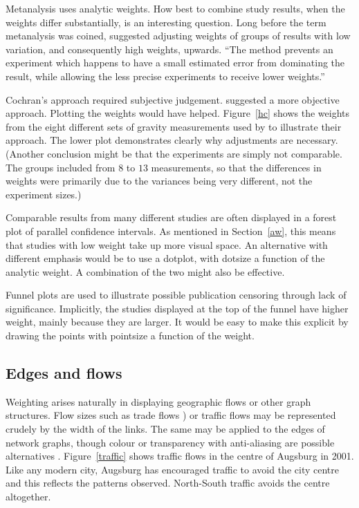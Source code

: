 \documentclass{svmult}
\begin{document}
Metanalysis uses analytic weights.  How best to combine study results, when the weights differ substantially, is an interesting question.  Long before the term metanalysis was coined, \cite{cochran:1954b} suggested adjusting weights of groups of results with low variation, and consequently high weights, upwards.  ``The method prevents an experiment which happens to have a small estimated error from dominating the result, while allowing the less precise experiments to receive lower weights.''

Cochran's approach required subjective judgement.  \cite{mosteller:1982} suggested a more objective approach.  Plotting the weights would have helped.  Figure~\ref{hc} shows the weights from the eight different sets of gravity measurements used by \cite{mosteller:1982} to illustrate their approach.  The lower plot demonstrates clearly why adjustments are necessary.  (Another conclusion might be that the experiments are simply not comparable.  The groups included from $8$ to $13$ measurements, so that the differences in weights were primarily due to the variances being very different, not the experiment sizes.)

Comparable results from many different studies are often displayed in a forest plot of parallel confidence intervals.  As mentioned in Section~\ref{aw}, this means that studies with low weight take up more visual space.  An alternative with different emphasis would be to use a dotplot, with dotsize a function of the analytic weight.  A combination of the two might also be effective.

Funnel plots are used to illustrate possible publication censoring through lack of significance.  Implicitly, the studies displayed at the top of the funnel have higher weight, mainly because they are larger.  It would be easy to make this explicit by drawing the points with pointsize a function of the weight.

\subsection{Edges and flows}
\label{edge}
Weighting arises naturally in displaying geographic flows or other graph structures.  Flow sizes such as trade flows \citep{unwin:1992}) or traffic flows may be represented crudely by the width of the links.  The same may be applied to the edges of network graphs, though colour or transparency with anti-aliasing are possible alternatives \citep{wills:2006}.  Figure~\ref{traffic} shows traffic flows in the centre of Augsburg in 2001.   Like any modern city, Augsburg has encouraged traffic to avoid the city centre and this reflects the patterns observed.  North-South traffic avoids the centre altogether.
\end{document}
